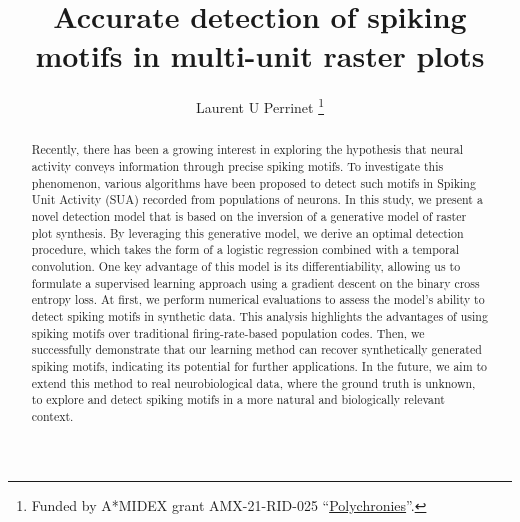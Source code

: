 \documentclass[runningheads]{llncs}
\begin{document}
\title{Accurate detection of spiking motifs in multi-unit raster plots}

\author{
Laurent U Perrinet
\thanks{Funded by A*MIDEX grant AMX-21-RID-025 ``\href{https://laurentperrinet.github.io/grant/polychronies/}{Polychronies}''.}}
%
%
%
\maketitle              %
%
\begin{abstract} 
Recently, there has been a growing interest in exploring the hypothesis that neural activity conveys information through precise spiking motifs. To investigate this phenomenon, various algorithms have been proposed to detect such motifs in Spiking Unit Activity (SUA) recorded from populations of neurons.
In this study, we present a novel detection model that is based on the inversion of a generative model of raster plot synthesis. By leveraging this generative model, we derive an optimal detection procedure, which takes the form of a logistic regression combined with a temporal convolution. One key advantage of this model is its differentiability, allowing us to formulate a supervised learning approach using a gradient descent on the binary cross entropy loss. 
At first, we perform numerical evaluations to assess the model's ability to detect spiking motifs in synthetic data. This analysis highlights the advantages of using spiking motifs over traditional firing-rate-based population codes. Then, we successfully demonstrate that our learning method can recover synthetically generated spiking motifs, indicating its potential for further applications. In the future, we aim to extend this method to real neurobiological data, where the ground truth is unknown, to explore and detect spiking motifs in a more natural and biologically relevant context.
%
\end{abstract}
\end{document}
